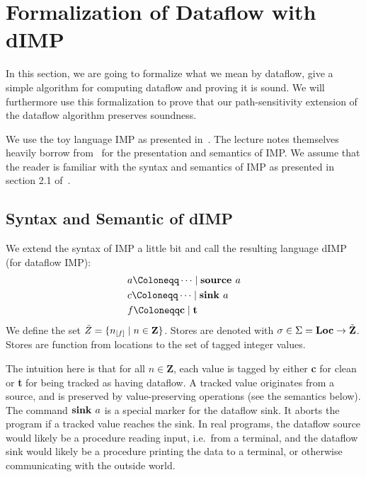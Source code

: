 \section{Formalization of Dataflow with dIMP}

In this section, we are going to formalize what we mean by dataflow,
give a simple algorithm for computing dataflow and proving it is sound.
We will furthermore use this formalization to prove that our
path-sensitivity extension of the dataflow algorithm preserves soundness.

We use the toy language IMP as presented in~\cite{sat}.
The lecture notes themselves heavily borrow from~\cite{fsopl} for the
presentation and semantics of IMP.
We assume that the reader is familiar with the syntax and semantics of IMP
as presented in section 2.1 of~\cite{sat}.

\subsection{Syntax and Semantic of dIMP}
We extend the syntax of IMP a little bit
and call the resulting language dIMP (for dataflow IMP):
\begin{align*}
    &a \Coloneqq \dots \mid \defaultsource\\
    &c \Coloneqq \dots \mid \defaultsink\\
    &f \Coloneqq \textbf{c} \mid \textbf{t}\\
\end{align*}
We define the set $\StoreDomain =\{\flagged{} \mid n \in \textbf{Z}\}$.
Stores are denoted with $\sigma \in \Sigma = \textbf{Loc} \to \tilde{\textbf{Z}}$.
Stores are function from locations to the set of tagged integer
values.

The intuition here is that for all $n \in \textbf{Z}$, 
each value is tagged by either \textbf{c} for clean or \textbf{t} for being tracked
as having dataflow.
A tracked value originates from a source, and is preserved by value-preserving
operations (see the semantics below).
The command $\textbf{sink }{a}$ is a special marker for the dataflow sink.
It aborts the program if a tracked value reaches the sink.
In real programs, the dataflow source would likely be a procedure reading input,
i.e.\ from a terminal, and the dataflow sink would likely be a procedure 
printing the data to a terminal, or otherwise communicating with the outside world.


